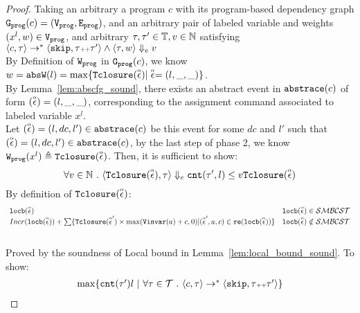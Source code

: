 \begin{proof}
  Taking an arbitrary a program ${c}$ with its program-based dependency graph 
  $\progG(c) = (\progV, \progE)$, 
  and an arbitrary pair of labeled variable and weights $(x^l, w) \in \progV$, 
  and arbitrary $\vtrace, \trace' \in \mathbb{T},
  v \in \mathbb{N}$ satisfying
  \\
  $\config{{c}, \trace} \to^{*} \config{\eskip, \trace\tracecat\vtrace'} 
  \land 
  \config{\trace, w} \earrow v$
  \\
  By Definition of $\progW$ in $\progG(c)$, we know 
  $  w = \absW(l) = \max \{ \absclr(\absevent) | \absevent = (l, \_, \_)\}$.
  \\
  By Lemma~\ref{lem:abscfg_sound}, there exists an abstract event in $\absflow(c)$ of form $(\absevent) = (l, \_, \_)$,
  corresponding to the assignment command associated to labeled variable $x^l$. 
  \\
  Let $(\absevent) = (l, dc, l') \in \absflow(c)$ be this event for some $dc$ and $l'$ such that  $(\absevent) = (l, dc, l') \in \absflow(c)$,
  by the last step of phase 2, we know
  $
  \progW(x^l) 
  \triangleq \absclr(\absevent)
  $.
   Then, it is sufficient to show:
  \[
  \forall v \in \mathbb{N} \sthat   
  \config{\absclr(\absevent), \trace} \earrow 
  \vcounter(\vtrace', l) \leq v
  \absclr(\absevent)
  \]
  By definition of $\absclr(\absevent)$:
  \[
 \begin{array}{ll}
  \locbound(\absevent) & \locbound(\absevent) \in \constdom \\
  Incr(\locbound(\absevent)) + 
  \sum\{\absclr(\absevent') \times \max(\varinvar(a) + c, 0) | (\absevent', a, c) \in \reset(\locbound(\absevent))\} 
  & \locbound(\absevent) \notin \constdom
\end{array}
\]
  \caseL{$\locbound(\absevent) \in \constdom$}
  \\
  Proved by the soundness of Local bound in Lemma~\ref{lem:local_bound_sound}.
  \caseL{$\locbound(\absevent) \notin \constdom$}
To show:
\[
  \begin{array}{l}
    \max \left\{ \vcounter(\vtrace') l ~ \middle\vert~
\forall \vtrace \in \mathcal{T} \sthat   \config{{c}, \trace} \to^{*} \config{\eskip, \trace\tracecat\vtrace'} \right\} 

\end{array}\]
\end{proof}
